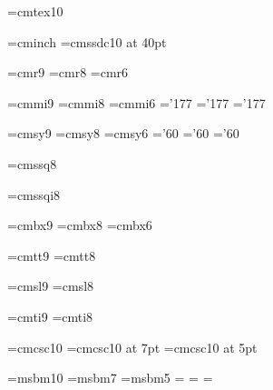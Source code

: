 \font\tentex=cmtex10

\font\inchhigh=cminch
\font\titlefont=cmssdc10 at 40pt

\font\ninerm=cmr9
\font\eightrm=cmr8
\font\sixrm=cmr6

\font\ninei=cmmi9
\font\eighti=cmmi8
\font\sixi=cmmi6
\skewchar\ninei='177 \skewchar\eighti='177 \skewchar\sixi='177

\font\ninesy=cmsy9
\font\eightsy=cmsy8
\font\sixsy=cmsy6
\skewchar\ninesy='60 \skewchar\eightsy='60 \skewchar\sixsy='60

\font\eightss=cmssq8

\font\eightssi=cmssqi8

\font\ninebf=cmbx9
\font\eightbf=cmbx8
\font\sixbf=cmbx6

\font\ninett=cmtt9
\font\eighttt=cmtt8

\font\ninesl=cmsl9
\font\eightsl=cmsl8

\font\nineit=cmti9
\font\eightit=cmti8
\newskip\ttglue

\font\tensc=cmcsc10
\font\sevensc=cmcsc10 at 7pt
\font\fivesc=cmcsc10 at 5pt

\def\mathsc#1{{\mathchoice
  {\hbox{\tensc#1}}
  {\hbox{\tensc#1}}
  {\hbox{\sevensc#1}}
  {\hbox{\fivesc#1}}
}}

\def\textsc#1{{\tensc #1}}

\font\tenamsb=msbm10 \font\sevenamsb=msbm7 \font\fiveamsb=msbm5
\newfam\bbfam
\textfont\bbfam=\tenamsb
\scriptfont\bbfam=\sevenamsb
\scriptscriptfont\bbfam=\fiveamsb

\def\bbb{\fam\bbfam}
\def\mathbb#1{{\bbb #1}}


\def\ninepoint{\def\rm{\fam0\ninerm}%
  \textfont0=\ninerm \scriptfont0=\sixrm \scriptscriptfont0=\fiverm
  \textfont1=\ninei \scriptfont1=\sixi \scriptscriptfont1=\fivei
  \textfont2=\ninesy \scriptfont2=\sixsy \scriptscriptfont2=\fivesy
  \textfont3=\tenex \scriptfont3=\tenex \scriptscriptfont3=\tenex
  \def\it{\fam\itfam\nineit}%
  \textfont\itfam=\nineit
  \def\sl{\fam\slfam\ninesl}%
  \textfont\slfam=\ninesl
  \def\bf{\fam\bffam\ninebf}%
  \textfont\bffam=\ninebf \scriptfont\bffam=\sixbf
   \scriptscriptfont\bffam=\fivebf
  \def\tt{\fam\ttfam\ninett}%
  \textfont\ttfam=\ninett
  \tt \ttglue=.5em plus.25em minus.15em
  \normalbaselineskip=11pt
  \def\MF{{\manual hijk}\-{\manual lmnj}}%
  \let\big=\ninebig
  \normalbaselines\rm}


